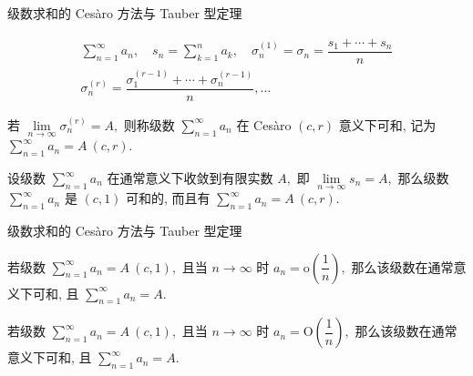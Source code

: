 
\begin{frame}{级数求和的 Cesàro 方法与 Tauber 型定理}

\vspace{-2em}

\begin{gather*}
\sum\limits_{n=1}^\infty a_n, \quad s_n = \sum\limits_{k=1}^n a_k, \quad \sigma_n^{(1)} = \sigma_n = \dfrac{s_1 + \cdots + s_n}{n}\\
\sigma_n^{(r)} = \dfrac{\sigma_1^{(r-1)} + \cdots + \sigma_n^{(r-1)}}{n}, \dots
\end{gather*}

\pause

\begin{Def}
若 $\lim\limits_{n\to\infty} \sigma_n^{(r)} = A,$ 则称级数 $\sum\limits_{n=1}^\infty a_n$ 在 Cesàro $(c,r)$ 意义下可和, 记为 $\sum\limits_{n=1}^\infty a_n = A ~ (c,r).$
\end{Def}

\pause

\begin{prop}
设级数 $\sum\limits_{n=1}^{\infty} a_n$ 在通常意义下收敛到有限实数 $A,$ 即 $\lim\limits_{n \to \infty} s_n = A,$ 那么级数 $\sum\limits_{n=1}^{\infty} a_n$ 是 $(c, 1)$ 可和的, 而且有 $\sum\limits_{n=1}^{\infty} a_n = A ~ (c,r).$
\end{prop}

\end{frame}


\begin{frame}{级数求和的 Cesàro 方法与 Tauber 型定理}

\begin{thm}[Tauber]
若级数 $\sum\limits_{n=1}^{\infty} a_n = A~(c, 1),$ 且当 $n\to\infty$ 时 $a_n = \mathrm{o} \left( \dfrac{1}{n} \right),$ 那么该级数在通常意义下可和, 且 $\sum\limits_{n=1}^{\infty} a_n = A.$
\end{thm}

\pause

\begin{thm}[Hardy]
若级数 $\sum\limits_{n=1}^{\infty} a_n = A~(c, 1),$ 且当 $n\to\infty$ 时 $a_n = \mathrm{O} \left( \dfrac{1}{n} \right),$ 那么该级数在通常意义下可和, 且 $\sum\limits_{n=1}^{\infty} a_n = A.$
\end{thm}

\end{frame}

